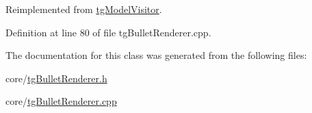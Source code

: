 Reimplemented from \hyperlink{classtg_model_visitor_ac8567b6bbe2c62ddc44c11136502261b}{tg\-Model\-Visitor}.



Definition at line 80 of file tg\-Bullet\-Renderer.\-cpp.



The documentation for this class was generated from the following files\-:\begin{DoxyCompactItemize}
\item 
core/\hyperlink{tg_bullet_renderer_8h}{tg\-Bullet\-Renderer.\-h}\item 
core/\hyperlink{tg_bullet_renderer_8cpp}{tg\-Bullet\-Renderer.\-cpp}\end{DoxyCompactItemize}
